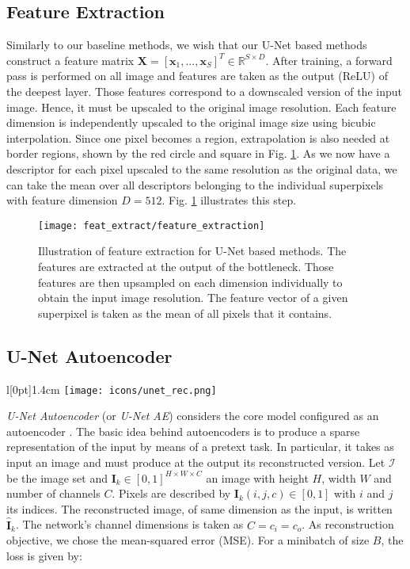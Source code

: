 \clearpage
\subsection{Feature Extraction} \label{feat_extract}
Similarly to our baseline methods, we wish that our U-Net based methods construct a feature matrix $\boldsymbol{X} = [\boldsymbol{x}_1,...,\boldsymbol{x}_S]^T \in \mathbb{R}^{S \times D}$.
After training, a forward pass is performed on all image and features are taken as the output (ReLU) of the deepest layer.
Those features correspond to a downscaled version of the input image.
Hence, it must be upscaled to the original image resolution.
Each feature dimension is independently upscaled to the original image size using bicubic interpolation.
Since one pixel becomes a region, extrapolation is also needed at border regions, shown by the red circle and square in Fig. \ref{fig:feat_extract}.
As we now have a descriptor for each pixel upscaled to the same resolution as the original data, we can take the mean over all descriptors belonging to the individual superpixels with feature dimension $D=512$.
Fig. \ref{fig:feat_extract} illustrates this step.
\vspace{10pt}

\begin{figure}[htbp]
  \centering
  \texttt{[image: feat\_extract/feature\_extraction]}
  \caption[Feature extraction model]{Illustration of feature extraction for U-Net based methods.
    The features are extracted at the output of the bottleneck.
    Those features are then upsampled on each dimension individually to obtain the input image resolution.
    The feature vector of a given superpixel is taken as the mean of all pixels that it contains.}
  \label{fig:feat_extract}
\end{figure}

\subsection{U-Net Autoencoder}
\begingroup
\setlength\intextsep{0pt}
\begin{wrapfigure}[4]{l}[0pt]{1.4cm}
\texttt{[image: icons/unet\_rec.png]}
\end{wrapfigure}

\textit{U-Net Autoencoder} (or \textit{U-Net AE}) considers the core model configured as an autoencoder \cite{vincent10}.
The basic idea behind autoencoders is to produce a sparse representation of the input by means of a pretext task.
In particular, it takes as input an image and must produce at the output its reconstructed version.
Let $\mathcal{I}$ be the image set and $\boldsymbol{I}_k \in [0,1]^{H \times W \times C}$ an image with height $H$, width $W$ and number of channels $C$.
Pixels are described by $\boldsymbol{I}_k(i,j,c) \in [0,1]$ with $i$ and $j$ its indices.
The reconstructed image, of same dimension as the input, is written $\boldsymbol{\hat{I}}_k$.
The network's channel dimensions is taken as $C = c_i = c_o$.
As reconstruction objective, we chose the mean-squared error (MSE).
For a minibatch of size $B$, the loss is given by:

